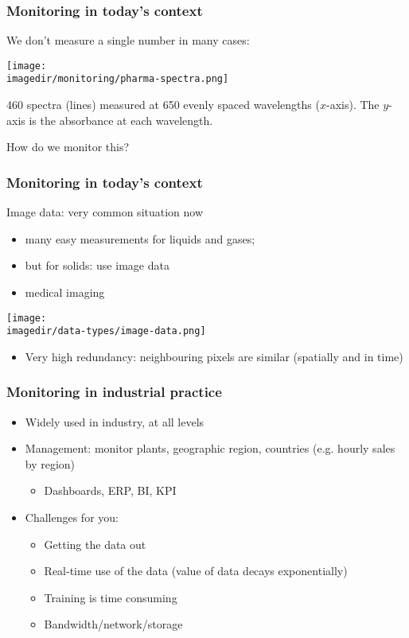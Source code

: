 \begin{frame}\frametitle{Monitoring in today's context}

	We don't measure a single number in many cases:

	\texttt{[image: \\imagedir/monitoring/pharma-spectra.png]}

	460 spectra (lines) measured at 650 evenly spaced wavelengths ($x$-axis). The $y$-axis is the absorbance at each wavelength.

	How do we monitor this?
\end{frame}

\begin{frame}\frametitle{Monitoring in today's context}

	Image data: very common situation now
	\begin{itemize}
		\item	many easy measurements for liquids and gases;
		\item	but for solids: use image data
		\item	medical imaging
	\end{itemize}
	\begin{center}
		\texttt{[image: \\imagedir/data-types/image-data.png]}
	\end{center}
	\begin{itemize}
		\item	Very high redundancy: neighbouring pixels are similar (spatially and in time)
	\end{itemize}
\end{frame}

\begin{frame}\frametitle{Monitoring in industrial practice}
	\begin{itemize}
		\item	Widely used in industry, at all levels
		\item	Management: monitor plants, geographic region, countries (e.g. hourly sales by region)
		\begin{itemize}
			\item	Dashboards, ERP, BI, KPI
		\end{itemize}
	\end{itemize}
	\begin{itemize}
		\item	Challenges for you:
		\begin{itemize}
			\item	Getting the data out
			\item	Real-time use of the data (value of data decays exponentially)
			\item	Training is time consuming
			\item	Bandwidth/network/storage
		\end{itemize}
	\end{itemize}
\end{frame}


